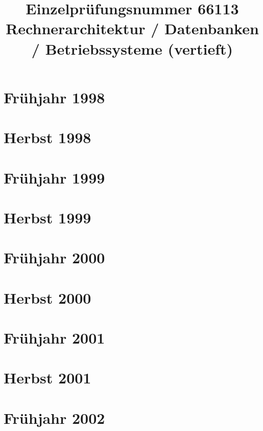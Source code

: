 \documentclass{lehramt-informatik-examen-sammlung}
\title{Einzelprüfungsnummer 66113\\Rechnerarchitektur / Datenbanken / Betriebssysteme (vertieft)}
\begin{document}
\maketitle
\tableofcontents

\section{Frühjahr 1998}


\section{Herbst 1998}


\section{Frühjahr 1999}


\section{Herbst 1999}


\section{Frühjahr 2000}


\section{Herbst 2000}


\section{Frühjahr 2001}


\section{Herbst 2001}


\section{Frühjahr 2002}

\end{document}
